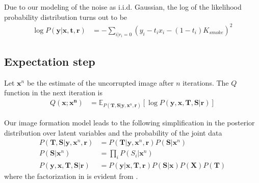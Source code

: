 Due to our modeling of the noise as i.i.d. Gaussian, the log of the likelihood probability distribution turns out to be
\begin{align}
\log P \left( \mathbf{y}| \mathbf{x}, \mathbf{t}, \mathbf{r} \right) &= - \sum_{i | r_i = 0} \left( y_i - t_i x_i - (1-t_i) K_{smoke} \right)^2
\end{align}


\subsection{Expectation step}
Let $\mathbf{x}^n$ be the estimate of the uncorrupted image after $n$ iterations. The $Q$ function in the next iteration is
\begin{align}
Q(\mathbf{x}; \mathbf{x^n}) &= \mathbb{E}_{ P \left( \mathbf{T}, \mathbf{S} | \mathbf{y}, \mathbf{x}^n, \mathbf{r} \right)} \left[ \log P \left( \mathbf{y}, \mathbf{x}, \mathbf{T}, \mathbf{S} | \mathbf{r} \right)\right] \label{eqn:Qvbem2}
\end{align}

Our image formation model leads to the following simplification in the posterior distribution over latent variables and the probability of the joint data
\begin{align}
P \left( \mathbf{T}, \mathbf{S} | \mathbf{y}, \mathbf{x}^n, \mathbf{r} \right) &= P \left( \mathbf{T} | \mathbf{y}, \mathbf{x}^n, \mathbf{r} \right) P \left( \mathbf{S} | \mathbf{x}^n \right) \label{eqn:latentPosterior}\\
P \left( \mathbf{S} | \mathbf{x}^n\right) &= \prod_{i} P \left( S_i | \mathbf{x}^n \right) \label{eqn:obCodeFact} \\
P \left( \mathbf{y}, \mathbf{x}, \mathbf{T}, \mathbf{S} | \mathbf{r} \right) &= P \left( \mathbf{y} | \mathbf{x}, \mathbf{T}, \mathbf{r} \right) P \left( \mathbf{S} | \mathbf{x} \right) P \left( \mathbf{X} \right) P \left( \mathbf{T} \right)
\end{align}
where the factorization in  is evident from .

